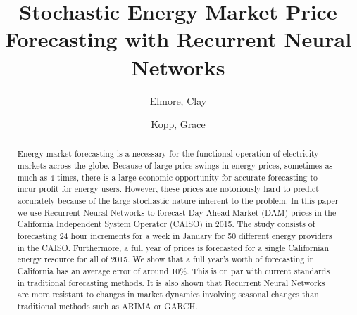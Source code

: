 \documentclass[sigconf]{acmart}
\begin{document}
%

%
\title{Stochastic Energy Market Price Forecasting with Recurrent Neural Networks}

%

\author{Elmore, Clay}

\author{Kopp, Grace}
%
\renewcommand{\shortauthors}{Elmore and Kopp, et al.}


\begin{abstract}
Energy market forecasting is a necessary for the functional operation of electricity markets across the globe. Because of large price swings in energy prices, sometimes as much as 4 times, there is a large economic opportunity for accurate forecasting to incur profit for energy users. However, these prices are notoriously hard to predict accurately because of the large stochastic nature inherent to the problem. In this paper we use Recurrent Neural Networks to forecast Day Ahead Market (DAM) prices in the California Independent System Operator (CAISO) in 2015. The study consists of forecasting 24 hour increments for a week in January for 50 different energy providers in the CAISO. Furthermore, a full year of prices is forecasted for a single Californian energy resource for all of 2015. We show that a full year's worth of forecasting in California has an average error of around 10\%. This is on par with current standards in traditional forecasting methods. It is also shown that Recurrent Neural Networks are more resistant to changes in market dynamics involving seasonal changes than traditional methods such as ARIMA or GARCH. 
\end{abstract}
\end{document}
